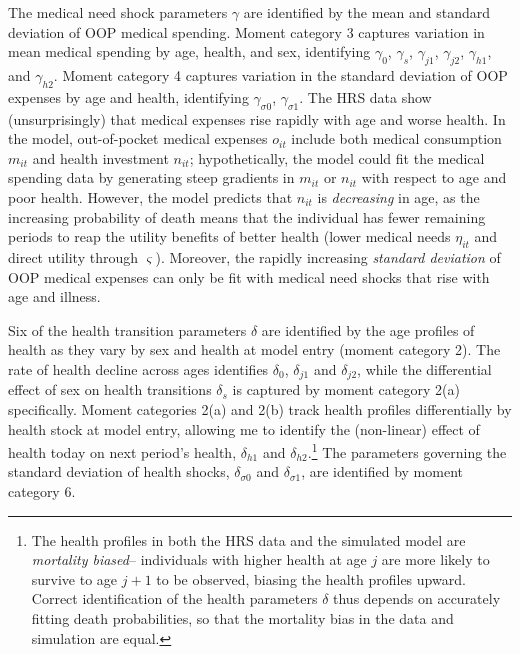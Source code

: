 \documentclass[12pt,pdftex,letterpaper]{article}
\newcommand{\Health}{h}
\newcommand{\Care}{m}
\newcommand{\Invst}{n}
\newcommand{\MedShkParam}{\gamma}
\newcommand{\OOP}{o}
\newcommand{\LifeUtility}{\varsigma}
\newcommand{\Age}{j}
\newcommand{\HealthParam}{\delta}
\newcommand{\Sex}{s}
\newcommand{\MedShk}{\eta}
\begin{document}
The medical need shock parameters $\MedShkParam$ are identified by the mean and standard deviation of OOP medical spending.  Moment category 3 captures variation in mean medical spending by age, health, and sex, identifying $\MedShkParam_0$, $\MedShkParam_{\Sex}$, $\MedShkParam_{\Age 1}$, $\MedShkParam_{\Age 2}$, $\MedShkParam_{\Health 1}$, and $\MedShkParam_{\Health 2}$.  Moment category 4 captures variation in the standard deviation of OOP expenses by age and health, identifying $\MedShkParam_{\sigma 0}$, $\MedShkParam_{\sigma 1}$.  The HRS data show (unsurprisingly) that medical expenses rise rapidly with age and worse health.  In the model, out-of-pocket medical expenses $\OOP_{it}$ include both medical consumption $\Care_{it}$ and health investment $\Invst_{it}$; hypothetically, the model could fit the medical spending data by generating steep gradients in $\Care_{it}$ or $\Invst_{it}$ with respect to age and poor health. However, the model predicts that $\Invst_{it}$ is \textit{decreasing} in age, as the increasing probability of death means that the individual has fewer remaining periods to reap the utility benefits of better health (lower medical needs $\MedShk_{it}$ and direct utility through $\LifeUtility$).  Moreover, the rapidly increasing \textit{standard deviation} of OOP medical expenses can only be fit with medical need shocks that rise with age and illness.  

Six of the health transition parameters $\HealthParam$ are identified by the age profiles of health as they vary by sex and health at model entry (moment category 2).  The rate of health decline across ages identifies $\HealthParam_0$, $\HealthParam_{\Age 1}$ and $\HealthParam_{\Age 2}$, while the differential effect of sex on health transitions $\HealthParam_{\Sex}$ is captured by moment category 2(a) specifically.  Moment categories 2(a) and 2(b) track health profiles differentially by health stock at model entry, allowing me to identify the (non-linear) effect of health today on next period's health, $\HealthParam_{\Health 1}$ and $\HealthParam_{\Health 2}$.\footnote{The health profiles in both the HRS data and the simulated model are \textit{mortality biased}-- individuals with higher health at age $\Age$ are more likely to survive to age $\Age+1$ to be observed, biasing the health profiles upward.  Correct identification of the health parameters $\HealthParam$ thus depends on accurately fitting death probabilities, so that the mortality bias in the data and simulation are equal.}  The parameters governing the standard deviation of health shocks, $\HealthParam_{\sigma 0}$ and $\HealthParam_{\sigma 1}$, are identified by moment category 6.
\end{document}
